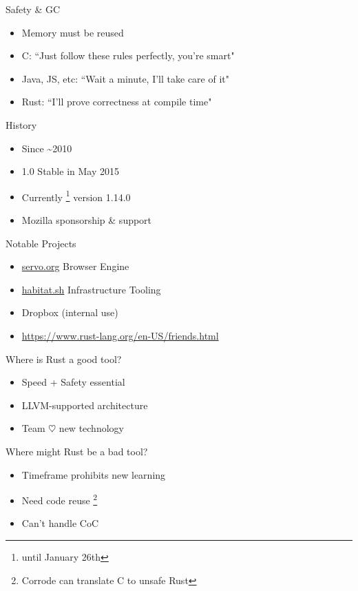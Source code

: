\documentclass[aspectratio=169]{beamer}
\begin{document}
\begin{frame}
    Safety \& GC
    \begin{itemize}
        \item Memory must be reused
        \item C: ``Just follow these rules perfectly, you're smart"
        \item Java, JS, etc: ``Wait a minute, I'll take care of it"
        \item Rust: ``I'll prove correctness at compile time"
    \end{itemize}
\end{frame}

\begin{frame}
    History
    \begin{itemize}
        \item Since \textasciitilde 2010
        \item 1.0 Stable in May 2015
        \item Currently \footnote{until January 26th} version 1.14.0
        \item Mozilla sponsorship \& support
    \end{itemize}
\end{frame}

\begin{frame}
    Notable Projects
    \begin{itemize}
        \item \url{servo.org} Browser Engine
        \item \url{habitat.sh} Infrastructure Tooling
        \item Dropbox (internal use)
        \item \url{https://www.rust-lang.org/en-US/friends.html}
    \end{itemize}
\end{frame}

\begin{frame}
    Where is Rust a good tool?
    \begin{itemize}
        \item Speed + Safety essential
        \item LLVM-supported architecture
        \item Team $\heartsuit$ new technology
    \end{itemize}
\end{frame}

\begin{frame}
    Where might Rust be a bad tool?
    \begin{itemize}
        \item Timeframe prohibits new learning
        \item Need code reuse \footnote{Corrode can translate C to unsafe Rust}
        \item Can't handle CoC
    \end{itemize}
\end{frame}
\end{document}
